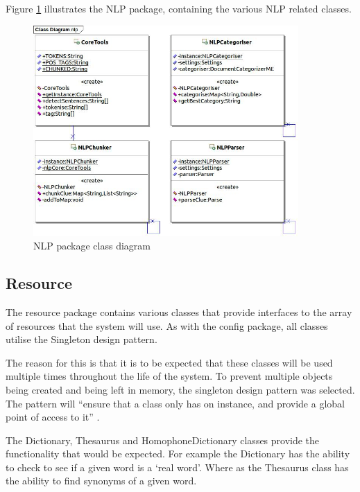 
Figure \ref{fig:nlp_package} illustrates the NLP package, containing the 
various NLP related classes.

\begin{figure}[H]
  \centering
  \includegraphics[width=0.9\textwidth]{class/nlp.jpg}
  \caption{NLP package class diagram}
  \label{fig:nlp_package}
\end{figure}


\subsection{Resource}
\label{sub:resource}

The resource package contains various classes that provide interfaces to the 
array of resources that the system will use. As with the config package, all 
classes utilise the Singleton design pattern. 

The reason for this is that it is to be expected that these classes will be used
multiple times throughout the life of the system. To prevent multiple objects 
being created and being left in memory, the singleton design pattern was 
selected. The pattern will ``ensure that a class only has on instance, and 
provide a global point of access to it'' \citep{gof}.

The Dictionary, Thesaurus and HomophoneDictionary classes provide the 
functionality that would be expected. For example the Dictionary has the ability
to check to see if a given word is a `real word'. Where as the Thesaurus class
has the ability to find synonyms of a given word.

